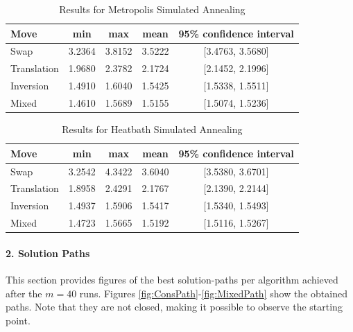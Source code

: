 \documentclass{paper}
\begin{document}
\begin{table}[!h]
\centering
\caption{Results for Metropolis Simulated Annealing}
\label{tab:metroSA}
\begin{tabular}{| l ||c|c|c|c|}
\hline
Move                  &  min & max & mean & 95\% confidence interval \\ \hline \hline
Swap              &      3.2364   &      3.8152    &      3.5222     &      [3.4763,   3.5680]     \\  \hline 
Translation       &    1.9680   &      2.3782    &      2.1724     &      [2.1452,   2.1996]      \\ \hline
Inversion     &         1.4910   &      1.6040    &      1.5425     &      [1.5338,   1.5511]      \\ \hline
Mixed          &         1.4610   &      1.5689    &      1.5155     &      [1.5074,   1.5236]      \\ \hline
\end{tabular}
\end{table}

\begin{table}[!h]
\centering
\caption{Results for Heatbath Simulated Annealing}
\label{tab:heatSA}
\begin{tabular}{| l ||c|c|c|c|}
\hline
Move                  &  min & max & mean & 95\% confidence interval \\ \hline \hline
Swap              &      3.2542   &      4.3422    &      3.6040     &      [3.5380,   3.6701]     \\  \hline 
Translation       &    1.8958   &      2.4291    &      2.1767     &      [2.1390,   2.2144]      \\ \hline
Inversion     &         1.4937   &      1.5906    &      1.5417     &      [1.5340,   1.5493]      \\ \hline
Mixed          &         1.4723   &      1.5665    &      1.5192     &      [1.5116,   1.5267]      \\ \hline
\end{tabular}
\end{table}


\paragraph{2. Solution Paths}

This section provides figures of the best solution-paths per algorithm achieved after the $m=40$ runs. Figures \ref{fig:ConsPath}-\ref{fig:MixedPath} show the obtained paths. Note that they are not closed, making it possible to observe the starting point.
\end{document}
